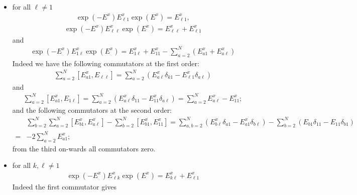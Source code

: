 \documentclass[11pt]{article}
\numberwithin{equation}{section}
\numberwithin{equation}{subsection}
\begin{document}
\begin{itemize}
    \item for all $\ell\neq 1$ 
\begin{equation}
    \begin{split}
        \exp{(-E^{x})}E_{\ell1}^{x}\exp{(E^{x})}=E_{\ell1}^{x},
    \end{split}
\end{equation}
\begin{equation}
    \begin{split}
    \exp{(-E^{x})}E_{\ell\ell}^{x}\exp{(E^{x})}=E_{\ell\ell}^{x}+E_{\ell1}^{x}
    \end{split}
\end{equation}
and
\begin{equation}
\begin{split}
    \exp{(-E^{x})}E_{1\ell}^{x}\exp{(E^{x})}=E_{1\ell}^{x}+E_{11}^{x}-\sum_{a=2}^{N}\left(E_{a1}^{x}+E_{a\ell}^{x}\right)
\end{split}
\end{equation}
Indeed we have the following commutators at the first order:
\begin{align*}
\sum_{a=2}^{N}\left[E_{a1}^{x},E_{\ell\ell}\right]=\sum_{a=2}^{N}\left(E_{a\ell}^{x}\delta_{k1}-E_{\ell1}^{x}\delta_{a\ell}\right)
\end{align*}
and 
\begin{align*}
\sum_{a=2}^{N}\left[E_{a1}^{x},E_{1\ell}\right]=\sum_{a=2}^{N}\left(E_{a\ell}^{x}\delta_{11}-E_{11}^{x}\delta_{a\ell}\right)=\sum_{a=2}^{N}E_{a\ell}^{x}-E_{11}^{x};
\end{align*}
and the following commutators at the second order:
\begin{align*}
&\sum_{b=2}^{N}\sum_{a=2}^{N}\left[E_{b1}^{x},E_{a\ell}^{x}\right]-\sum_{b=2}^{N}\left[E_{b1}^{x},E_{11}^{x}\right]=\sum_{a,b=2}^{N}\left(E_{b\ell}^{x}\delta_{a1}-E_{a1}^{x}\delta_{b\ell}\right)-\sum_{b=2}^{N}\left(E_{b1}\delta_{11}-E_{11}\delta_{b1}\right)\\=&-2\sum_{a=2}^{N}E_{a1}^{x};
\end{align*}
from the third on-wards all commutators zero. 
\item for all $k,\ell\neq 1$
\begin{equation}
        \begin{split}
    \exp{(-E^{x})}E_{\ell k}^{x}\exp{(E^{x})}=E_{k\ell}^{x}+E_{\ell 1}^{x}
    \end{split}
\end{equation}
Indeed the first commutator gives
\begin{align*}

\end{align*}
\end{itemize}
\end{document}
